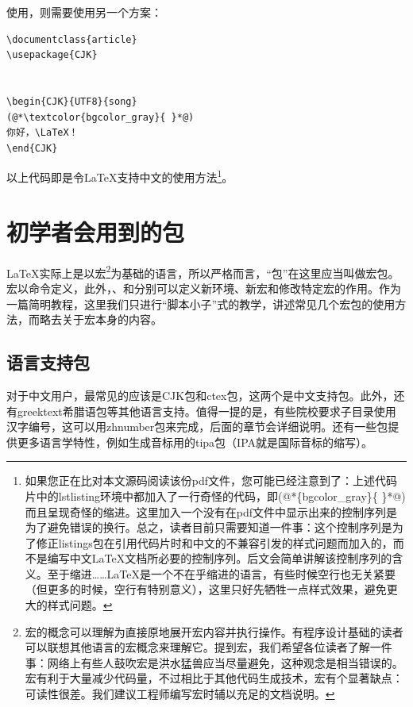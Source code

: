 使用\pdfLaTeX，则需要使用另一个方案：

\begin{lstlisting}[style = LaTeX_TeXworks, caption = 你好，中文\LaTeX - \pdfLaTeX]
\documentclass{article}
\usepackage{CJK}


\begin{CJK}{UTF8}{song}
(@*\textcolor{bgcolor_gray}{ }*@)
你好，\LaTeX！
\end{CJK}

\end{lstlisting}
以上代码即是令\LaTeX 支持中文的使用方法\footnote{如果您正在比对本文源码阅读该份pdf文件，您可能已经注意到了：上述代码片中的lstlisting环境中都加入了一行奇怪的代码，即(@*\{bgcolor\_gray\}\{ \}*@)而且呈现奇怪的缩进。这里加入一个没有在pdf文件中显示出来的控制序列是为了避免错误的换行。总之，读者目前只需要知道一件事：这个控制序列是为了修正listings包在引用代码片时和中文的不兼容引发的样式问题而加入的，而不是编写中文\LaTeX 文档所必要的控制序列。后文会简单讲解该控制序列的含义。至于缩进……\LaTeX 是一个不在乎缩进的语言，有些时候空行也无关紧要（但更多的时候，空行有特别意义），这里只好先牺牲一点样式效果，避免更大的样式问题。}。

\section{初学者会用到的包}

\LaTeX 实际上是以宏\footnote{宏的概念可以理解为直接原地展开宏内容并执行操作。有程序设计基础的读者可以联想其他语言的宏概念来理解它。提到宏，我们希望各位读者了解一件事：网络上有些人鼓吹宏是洪水猛兽应当尽量避免，这种观念是相当错误的。宏有利于大量减少代码量，不过相比于其他代码生成技术，宏有个显著缺点：可读性很差。我们建议工程师编写宏时辅以充足的文档说明。}为基础的语言，所以严格而言，“包”在这里应当叫做宏包。宏以命令定义，此外，、和分别可以定义新环境、新宏和修改特定宏的作用。作为一篇简明教程，这里我们只进行“脚本小子”式的教学，讲述常见几个宏包的使用方法，而略去关于宏本身的内容。


\subsection{语言支持包}

对于中文用户，最常见的应该是CJK包和ctex包，这两个是中文支持包。此外，还有greektext希腊语包等其他语言支持。值得一提的是，有些院校要求子目录使用汉字编号，这可以用zhnumber包来完成，后面的章节会详细说明。还有一些包提供更多语言学特性，例如生成音标用的tipa包（IPA就是国际音标的缩写）。

